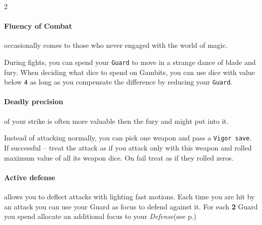 \begin{multicols*}{2}
\paragraph{Fluency of Combat} occasionally comes to those who never engaged with the world of magic.

During fights, you can spend your \texttt{Guard} to move in a strange dance of blade and fury. 
When deciding what dice to spend on Gambits, you can use dice with value below \texttt{4} as long as you compensate the difference by reducing your \texttt{Guard}.

\newcolumn

\paragraph{Deadly precision} of your strike is often more valuable then the fury and might put into it. 

Instead of attacking normally, you can pick one weapon and pass a \texttt{Vigor save}. 
If successful -- treat the attack as if you attack only with this weapon and rolled maximum value of all its weapon dice.
On fail treat as if they rolled zeros.


\paragraph{Active defense} allows you to deflect attacks with lighting fast motions. 
Each time you are hit by an attack you can use your Guard as focus to defend against it. 
For each \textbf{2} Guard you spend allocate an additional focus to your \emph{Defense}(see p.\pageref*{sec:combat})




\end{multicols*}
